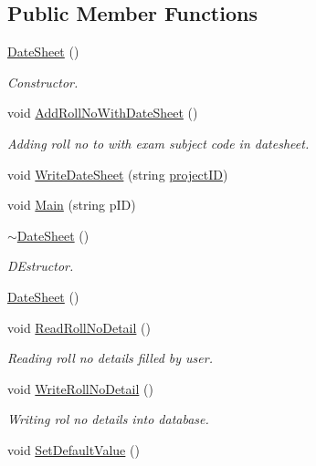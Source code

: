 \subsection*{Public Member Functions}
\begin{DoxyCompactItemize}
\item 
\hyperlink{classDateSheet_a17a1e5adc9b48e53091b89061ee0a360}{Date\-Sheet} ()
\begin{DoxyCompactList}\small\item\em Constructor. \end{DoxyCompactList}\item 
void \hyperlink{classDateSheet_a8c1bd0daf35e3ea6f962a03fe78cdfa3}{Add\-Roll\-No\-With\-Date\-Sheet} ()
\begin{DoxyCompactList}\small\item\em Adding roll no to with exam subject code in datesheet. \end{DoxyCompactList}\item 
void \hyperlink{classDateSheet_a3f7ea57a0ed85dc6c09f0eda9c30016b}{Write\-Date\-Sheet} (string \hyperlink{classInputDetail_a08069ee622c626c038b821ddcc7427b4}{project\-I\-D})
\item 
void \hyperlink{classDateSheet_af749306c14297b5c93c16f48f551d5bb}{Main} (string p\-I\-D)
\item 
\hyperlink{classDateSheet_af17d25ae4f39caf7b9ea62d73541813b}{$\sim$\-Date\-Sheet} ()
\begin{DoxyCompactList}\small\item\em D\-Estructor. \end{DoxyCompactList}\item 
\hyperlink{classDateSheet_a17a1e5adc9b48e53091b89061ee0a360}{Date\-Sheet} ()
\item 
void \hyperlink{classDateSheet_a0d68cd26658c7dfc37ef512e6ed30528}{Read\-Roll\-No\-Detail} ()
\begin{DoxyCompactList}\small\item\em Reading roll no details filled by user. \end{DoxyCompactList}\item 
void \hyperlink{classDateSheet_ab34e451b5322710f149a1fff5386d852}{Write\-Roll\-No\-Detail} ()
\begin{DoxyCompactList}\small\item\em Writing rol no details into database. \end{DoxyCompactList}\item 
void \hyperlink{classDateSheet_a2eab7d9256cd56064671ac4974846a7a}{Set\-Default\-Value} ()

\end{DoxyCompactItemize}
